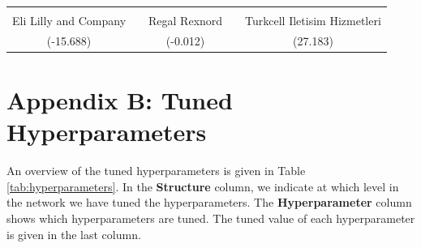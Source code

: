 \documentclass[11pt]{article}
\begin{document}
\begin{center}
\begin{table}[h]
{\begin{tabular}{clccc}
\multicolumn{1}{l}{}               &  &                             &                      &                                \\
Eli Lilly and Company              &  & Regal Rexnord               &                      & Turkcell Iletisim Hizmetleri   \\
(-15.688)                          &  & (-0.012)                    &                      & (27.183)                       \\ \bottomrule
\end{tabular}
}






\end{table}
\end{center}
















\newpage
\section*{Appendix B: Tuned Hyperparameters}\label{Appendix B}
An overview of the tuned hyperparameters is given in Table \ref{tab:hyperparameters}. In the \textbf{Structure} column, we indicate at which level in the network we have tuned the hyperparameters. The \textbf{Hyperparameter} column shows which hyperparameters are tuned. The tuned value of each hyperparameter is given in the last column. 
\end{document}
